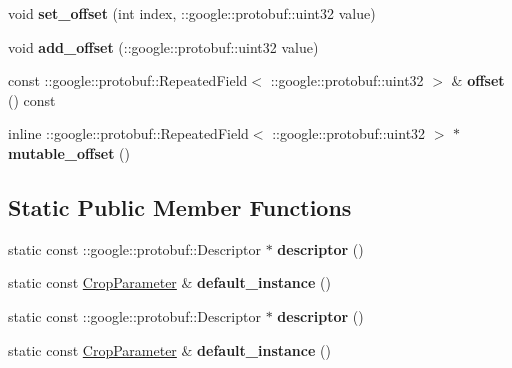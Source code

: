 \begin{DoxyCompactItemize}
\item 
\mbox{\label{classcaffe_1_1_crop_parameter_a35718e8324f05336542cb1ba75b82a8c}} 
void {\bfseries set\+\_\+offset} (int index, \+::google\+::protobuf\+::uint32 value)
\item 
\mbox{\label{classcaffe_1_1_crop_parameter_a827d1d3d4f0e7ab6807eaaed4f63c75b}} 
void {\bfseries add\+\_\+offset} (\+::google\+::protobuf\+::uint32 value)
\item 
\mbox{\label{classcaffe_1_1_crop_parameter_ae766fe7f31b1a0cd0ec39caf614a9c46}} 
const \+::google\+::protobuf\+::\+Repeated\+Field$<$ \+::google\+::protobuf\+::uint32 $>$ \& {\bfseries offset} () const
\item 
\mbox{\label{classcaffe_1_1_crop_parameter_a48d08de33fc0b3ed6ce60c8594ebfbbe}} 
inline \+::google\+::protobuf\+::\+Repeated\+Field$<$ \+::google\+::protobuf\+::uint32 $>$ $\ast$ {\bfseries mutable\+\_\+offset} ()
\end{DoxyCompactItemize}
\subsection*{Static Public Member Functions}
\begin{DoxyCompactItemize}
\item 
\mbox{\label{classcaffe_1_1_crop_parameter_a204971ef9fc7411028568a0a7958c961}} 
static const \+::google\+::protobuf\+::\+Descriptor $\ast$ {\bfseries descriptor} ()
\item 
\mbox{\label{classcaffe_1_1_crop_parameter_a2c9787afb8b240ade6d5f45644dac6c6}} 
static const \mbox{\hyperlink{classcaffe_1_1_crop_parameter}{Crop\+Parameter}} \& {\bfseries default\+\_\+instance} ()
\item 
\mbox{\label{classcaffe_1_1_crop_parameter_a7c2be5a1716ee053d0b39585fd349035}} 
static const \+::google\+::protobuf\+::\+Descriptor $\ast$ {\bfseries descriptor} ()
\item 
\mbox{\label{classcaffe_1_1_crop_parameter_abacf722eb8b9372665f4e8729b46c792}} 
static const \mbox{\hyperlink{classcaffe_1_1_crop_parameter}{Crop\+Parameter}} \& {\bfseries default\+\_\+instance} ()
\end{DoxyCompactItemize}
